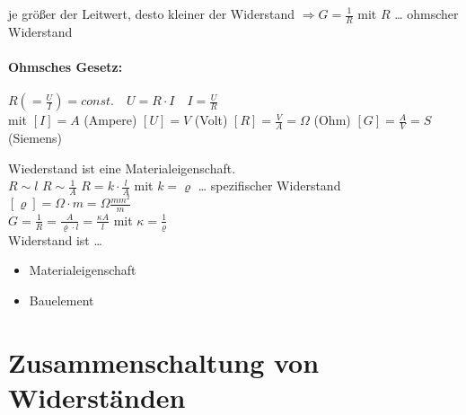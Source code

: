 \documentclass{scrreprt}
\begin{document}
je größer der Leitwert, desto kleiner der Widerstand $\Rightarrow G=\frac{1}{R}$ mit \quad $R$ … ohmscher Widerstand

\paragraph{Ohmsches Gesetz:}

$R\left(=\frac{U}{I}\right)=const. \quad U= R\cdot I \quad I = \frac{U}{R} $\\
mit $[I]=A$ (Ampere) \quad $[U]=V$ (Volt) \quad $[R]=\frac{V}{A}=\Omega$ (Ohm) \quad $[G]=\frac{A}{V} = S$ (Siemens)

Wiederstand ist eine Materialeigenschaft.\\
$R \sim l$ \quad $R\sim \frac{1}{A}$ \quad $R=k \cdot \frac{l}{A}$ mit  \quad $k=\varrho$ … spezifischer Widerstand $[\varrho]=\Omega \cdot m = \Omega \frac{mm^2}{m}$\\
$G=\frac{1}{R}=\frac{A}{\varrho \cdot l}=\frac{\kappa A}{l}$ mit \quad $\kappa = \frac{1}{\varrho}$\smallskip\\
Widerstand ist …
\begin{itemize}
\item Materialeigenschaft
\item Bauelement \\
\end{itemize}

\section{Zusammenschaltung von Widerständen}
\end{document}
